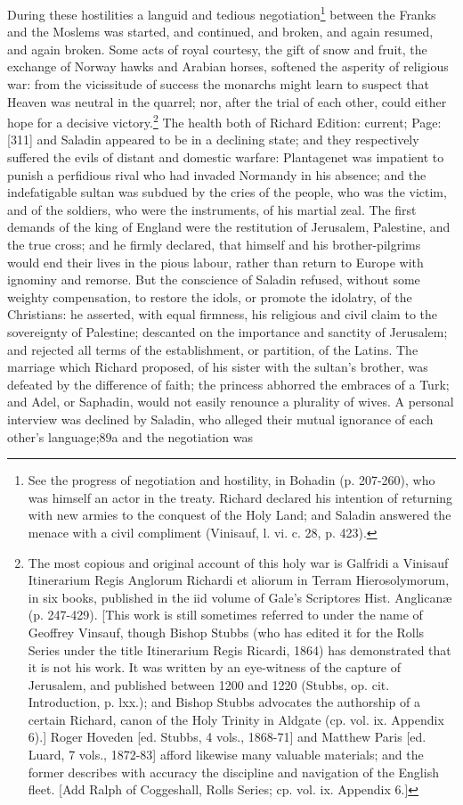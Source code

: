 During these hostilities a languid and tedious negotiation\footnote{See the progress of negotiation and hostility, in Bohadin (p. 207-260), who was himself an actor in the treaty. Richard declared his intention of returning with new armies to the conquest of the Holy Land; and Saladin answered the menace with a civil compliment (Vinisauf, l. vi. c. 28, p. 423).} between the Franks and the Moslems was started, and continued, and broken, and again resumed, and again broken. Some acts of royal courtesy, the gift of snow and fruit, the exchange of Norway hawks and Arabian horses, softened the asperity of religious war: from the vicissitude of success the monarchs might learn to suspect that Heaven was neutral in the quarrel; nor, after the trial of each other, could either hope for a decisive victory.\footnote{The most copious and original account of this holy war is Galfridi a Vinisauf Itinerarium Regis Anglorum Richardi et aliorum in Terram Hierosolymorum, in six books, published in the iid volume of Gale\texthebrew{}’s Scriptores Hist. Anglicanæ (p. 247-429). [This work is still sometimes referred to under the name of Geoffrey Vinsauf, though Bishop Stubbs (who has edited it for the Rolls Series under the title Itinerarium Regis Ricardi, 1864) has demonstrated that it is not his work. It was written by an eye-witness of the capture of Jerusalem, and published between 1200 and 1220 (Stubbs, op. cit. Introduction, p. lxx.); and Bishop Stubbs advocates the authorship of a certain Richard, canon of the Holy Trinity in Aldgate (cp. vol. ix. Appendix 6).] Roger Hoveden [ed. Stubbs, 4 vols., 1868-71] and Matthew Paris [ed. Luard, 7 vols., 1872-83] afford likewise many valuable materials; and the former describes with accuracy the discipline and navigation of the English fleet. [Add Ralph of Coggeshall, Rolls Series; cp. vol. ix. Appendix 6.]} The health both of Richard Edition: current; Page: [311] and Saladin appeared to be in a declining state; and they respectively suffered the evils of distant and domestic warfare: Plantagenet was impatient to punish a perfidious rival who had invaded Normandy in his absence; and the indefatigable sultan was subdued by the cries of the people, who was the victim, and of the soldiers, who were the instruments, of his martial zeal. The first demands of the king of England were the restitution of Jerusalem, Palestine, and the true cross; and he firmly declared, that himself and his brother-pilgrims would end their lives in the pious labour, rather than return to Europe with ignominy and remorse. But the conscience of Saladin refused, without some weighty compensation, to restore the idols, or promote the idolatry, of the Christians: he asserted, with equal firmness, his religious and civil claim to the sovereignty of Palestine; descanted on the importance and sanctity of Jerusalem; and rejected all terms of the establishment, or partition, of the Latins. The marriage which Richard proposed, of his sister with the sultan\texthebrew{}’s brother, was defeated by the difference of faith; the princess abhorred the embraces of a Turk; and Adel, or Saphadin, would not easily renounce a plurality of wives. A personal interview was declined by Saladin, who alleged their mutual ignorance of each other\texthebrew{}’s language;89a and the negotiation was 